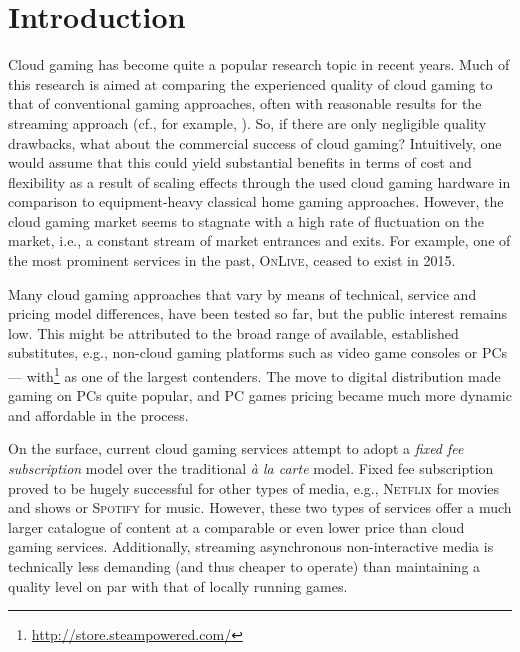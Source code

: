 
\section{Introduction}

Cloud gaming has become quite a popular research topic in recent years.
Much of this research is aimed at comparing the experienced quality of
cloud gaming to that of conventional gaming approaches, often with
reasonable results for the streaming approach (cf., for example,
\cite{5976180}). So, if there are only negligible quality drawbacks,
what about the commercial success of cloud gaming? Intuitively, one
would assume that this could yield substantial benefits in terms of cost
and flexibility as a result of scaling effects through the used cloud
gaming hardware in comparison to equipment-heavy classical home gaming
approaches. However, the cloud gaming market seems to stagnate with a
high rate of fluctuation on the market, i.e., a constant stream of
market entrances and exits. For example, one of the most prominent
services in the past, \textsc{OnLive}, ceased to exist in 2015.




Many cloud gaming approaches that vary by means of technical, service
and pricing model differences, have been tested so far, but the public
interest remains low. This might be attributed to the broad range of
available, established substitutes, e.g., non-cloud gaming platforms
such as video game consoles or PCs ---
with\steam\footnote{\url{http://store.steampowered.com/}} as one of the
largest contenders. The move to digital distribution made gaming on PCs
quite popular, and PC games pricing became much more dynamic and
affordable in the process.

On the surface, current cloud gaming services attempt to adopt a
\textit{fixed fee subscription} model over the traditional \textit{à la
carte} model. Fixed fee subscription proved to be hugely successful for
other types of media, e.g., \textsc{Netflix} for movies and shows or
\textsc{Spotify} for music. However, these two types of services offer a
much larger catalogue of content at a comparable or even lower price
than cloud gaming services. Additionally, streaming asynchronous
non-interactive media is technically less demanding (and thus cheaper to
operate) than maintaining a quality level on par with that of locally
running games.

